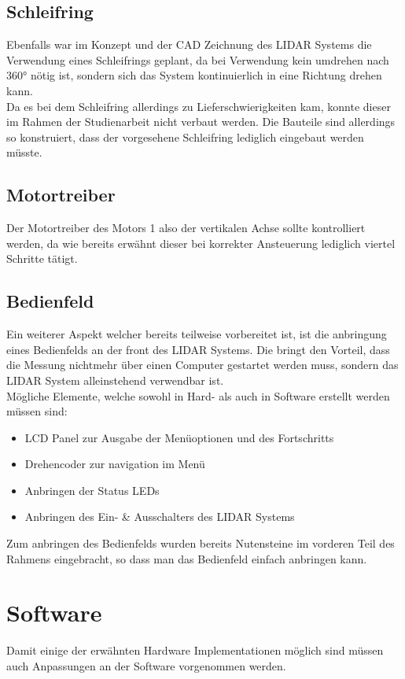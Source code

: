 \subsection{Schleifring}
Ebenfalls war im Konzept und der \ac{CAD} Zeichnung des \ac{LIDAR} Systems die Verwendung eines Schleifrings geplant, da bei Verwendung kein umdrehen nach 360° nötig ist, sondern sich das System kontinuierlich in eine Richtung drehen kann.\\
Da es bei dem Schleifring allerdings zu Lieferschwierigkeiten kam, konnte dieser im Rahmen der Studienarbeit nicht verbaut werden. Die Bauteile sind allerdings so konstruiert, dass der vorgesehene Schleifring lediglich eingebaut werden müsste. 
\subsection{Motortreiber}
Der Motortreiber des Motors 1 also der vertikalen Achse sollte kontrolliert werden, da wie bereits erwähnt dieser bei korrekter Ansteuerung lediglich viertel Schritte tätigt. 
\subsection{Bedienfeld}
Ein weiterer Aspekt welcher bereits teilweise vorbereitet ist, ist die anbringung eines Bedienfelds an der front des \ac{LIDAR} Systems. Die bringt den Vorteil, dass die Messung nichtmehr über einen Computer gestartet werden muss, sondern das \ac{LIDAR} System alleinstehend verwendbar ist.\\
Mögliche Elemente, welche sowohl in Hard- als auch in Software erstellt werden müssen sind:
\begin{itemize}
	\item LCD Panel zur Ausgabe der Menüoptionen und des Fortschritts
	\item Drehencoder zur navigation im Menü
	\item Anbringen der Status \acp{LED}
	\item Anbringen des Ein- \& Ausschalters des \ac{LIDAR} Systems
\end{itemize}
Zum anbringen des Bedienfelds wurden bereits Nutensteine im vorderen Teil des Rahmens eingebracht, so dass man das Bedienfeld einfach anbringen kann.

\section{Software}
Damit einige der erwähnten Hardware Implementationen möglich sind müssen auch Anpassungen an der Software vorgenommen werden.
